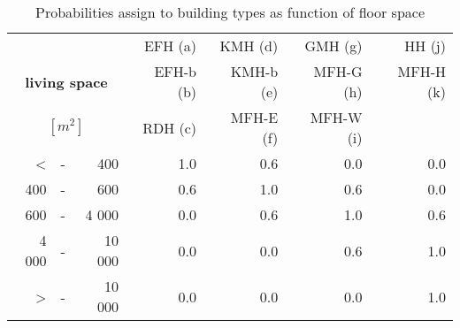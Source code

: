 \begin{table}[htb]
  \centering
  \caption{Probabilities assign to building types as function of floor space}
  \label{tab:pls}
  \begin{tabular}{rcr rrrr}
    \toprule
    &&&
    EFH (a)  & KMH (d)   & GMH (g)   & HH (j) \\ 
    \multicolumn{3}{c}{\textbf{living space}}& 
    EFH-b (b)& KMH-b (e)& MFH-G (h)& MFH-H (k)\\
    \multicolumn{3}{c}{$[m^2]$}& 
    RDH (c)   & MFH-E (f)& MFH-W (i)& \\
    \midrule
\textless &-&    400     & 1.0 & 0.6 & 0.0 & 0.0 \\
      400 &-&    600     & 0.6 & 1.0 & 0.6 & 0.0 \\
      600 &-&  4 000     & 0.0 & 0.6 & 1.0 & 0.6 \\
    4 000 &-& 10 000     & 0.0 & 0.0 & 0.6 & 1.0 \\
\textgreater  &-& 10 000     & 0.0 & 0.0 & 0.0 & 1.0 \\
    \bottomrule
  \end{tabular}
\end{table}
